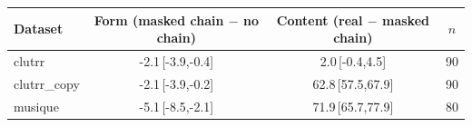 \begin{tabular}{lccc}
\toprule
Dataset & Form (masked chain $-$ no chain) & Content (real $-$ masked chain) & $n$ \\
\midrule
clutrr & -2.1\,{\scriptsize[-3.9,-0.4]} & 2.0\,{\scriptsize[-0.4,4.5]} & 90 \\
clutrr\_copy & -2.1\,{\scriptsize[-3.9,-0.2]} & 62.8\,{\scriptsize[57.5,67.9]} & 90 \\
musique & -5.1\,{\scriptsize[-8.5,-2.1]} & 71.9\,{\scriptsize[65.7,77.9]} & 80 \\
\bottomrule
\end{tabular}
